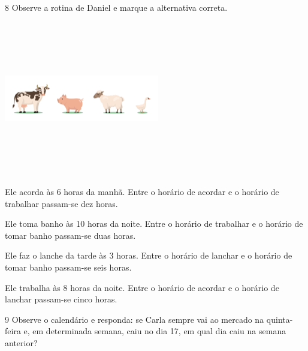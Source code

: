 \begin{escolha}
\begin{escolha}
\num{8} Observe a rotina de Daniel e marque a alternativa correta.

\includegraphics[width=2.66667in,height=2.65556in]{media/image116.png}


\begin{escolha}
\item Ele acorda às 6 horas da manhã. Entre o horário de acordar e o horário de trabalhar passam-se dez horas.

\item Ele toma banho às 10 horas da noite. Entre o horário de trabalhar e o horário de tomar banho passam-se duas horas.

\item Ele faz o lanche da tarde às 3 horas. Entre o horário de lanchar e o horário de tomar banho passam-se seis horas.

\item Ele trabalha às 8 horas da noite. Entre o horário de acordar e o horário de lanchar passam-se cinco horas.
\end{escolha}


\num{9} Observe o calendário e responda: se Carla sempre vai ao mercado na
quinta-feira e, em determinada semana, caiu no dia 17, em qual dia caiu na semana anterior?


\end{escolha}
\end{escolha}
